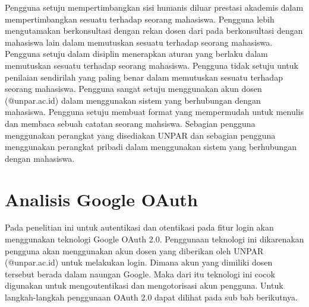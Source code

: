 Pengguna setuju mempertimbangkan sisi humanis diluar prestasi akademis dalam mempertimbangkan sesuatu terhadap seorang mahasiswa. Pengguna lebih mengutamakan berkonsultasi dengan rekan dosen dari pada berkonsultasi dengan mahasiswa lain dalam memutuskan sesuatu terhadap seorang mahasiswa. Pengguna setuju dalam disiplin menerapkan aturan yang berlaku dalam memutuskan sesuatu terhadap seorang mahasiswa. Pengguna tidak setuju untuk penilaian sendirilah yang paling benar dalam memutuskan sesuatu terhadap seorang mahasiswa. Pengguna sangat setuju menggunakan akun dosen (@unpar.ac.id) dalam menggunakan sistem yang berhubungan dengan mahasiswa. Pengguna setuju membuat format yang mempermudah untuk menulis dan membaca sebuah catatan seorang mahsiswa. Sebagian pengguna menggunakan perangkat yang disediakan UNPAR dan sebagian pengguna menggunakan perangkat pribadi dalam menggunakan sistem yang berhubungan dengan mahasiswa.

\section{Analisis Google OAuth}
\label{sec:analisisGoogleOAuth}

Pada penelitian ini untuk autentikasi dan otentikasi pada fitur login akan menggunakan teknologi Google OAuth 2.0. Penggunaan teknologi ini dikarenakan pengguna akan menggunakan akun dosen yang diberikan oleh UNPAR (@unpar.ac.id) untuk melakukan login. Dimana akun yang dimiliki dosen tersebut berada dalam naungan Google. Maka dari itu teknologi ini cocok digunakan untuk mengoutentikasi dan mengotorisasi akun pengguna. Untuk langkah-langkah penggunaan OAuth 2.0 dapat dilihat pada sub bab berikutnya.

